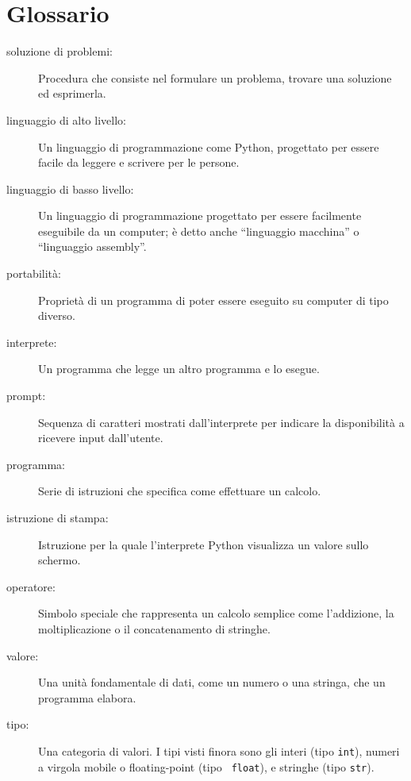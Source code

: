 \documentclass[10pt]{book}
\begin{document}
\section{Glossario}

\begin{description}

\item[soluzione di problemi:]  Procedura che consiste nel formulare un problema, trovare una soluzione ed esprimerla.

\item[linguaggio di alto livello:]  Un linguaggio di programmazione come Python, progettato per essere facile da leggere e scrivere per le persone.

\item[linguaggio di basso livello:]  Un linguaggio di programmazione progettato per essere facilmente eseguibile da un computer; è detto anche  ``linguaggio macchina'' o ``linguaggio assembly''.

\item[portabilità:]  Proprietà di un programma di poter essere eseguito su computer di tipo diverso.

\item[interprete:]  Un programma che legge un altro programma e lo esegue.

\item[prompt:] Sequenza di caratteri mostrati dall'interprete per indicare la disponibilità a ricevere input dall'utente.

\item[programma:] Serie di istruzioni che specifica come effettuare un calcolo.

\item[istruzione di stampa:]  Istruzione per la quale l'interprete Python  visualizza un valore sullo schermo.

\item[operatore:]  Simbolo speciale che rappresenta un calcolo semplice come l'addizione, la moltiplicazione o il concatenamento di stringhe.

\item[valore:]  Una unità fondamentale di dati, come un numero o una stringa, che un programma elabora.

\item[tipo:] Una categoria di valori. I tipi visti finora sono gli interi (tipo {\tt int}), numeri a virgola mobile o floating-point (tipo {\tt
float}), e stringhe (tipo {\tt str}).


\end{description}
\end{document}
